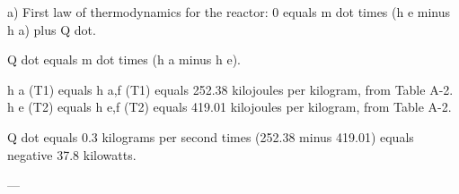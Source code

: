 a) First law of thermodynamics for the reactor:  
0 equals m dot times (h e minus h a) plus Q dot.  

Q dot equals m dot times (h a minus h e).  

h a (T1) equals h a,f (T1) equals 252.38 kilojoules per kilogram, from Table A-2.  
h e (T2) equals h e,f (T2) equals 419.01 kilojoules per kilogram, from Table A-2.  

Q dot equals 0.3 kilograms per second times (252.38 minus 419.01) equals negative 37.8 kilowatts.  

---